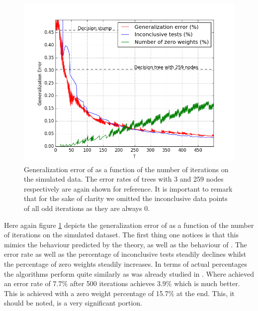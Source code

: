 \begin{figure}[!ht]
  \centering
      \includegraphics[width=\graphWidth]{generated/NHGD.png}
  \caption{Generalization error of \NHB as a function of the number of iterations on the simulated data. The error rates of trees with 3 and 259 nodes respectively are again shown for reference. It is important to remark that for the sake of clarity we omitted the inconclusive data points of all odd iterations as they are always 0.}
      \label{fig:NHBGD}
\end{figure}
 \FloatBarrier
 \par Here again figure \ref{fig:NHBGD} depicts the generalization error of \NHB as a function of the number of iterations on the simulated dataset. The first thing one notices is that this mimics the behaviour predicted by the theory, as well as the behaviour of \adaB. The error rate as well as the percentage of inconclusive tests steadily declines whilst the percentage of zero weights steadily increases. In terms of actual percentages the algorithms perform quite similarly as was already studied in \cite{Luo2014}. Where \adaB achieved an error rate of 7.7\% after 500 iterations \NHB achieves 3.9\% which is much better. This is achieved with a zero weight percentage of 15.7\% at the end. This, it should be noted, is a very significant portion. 
